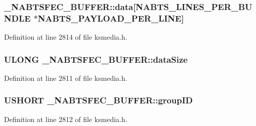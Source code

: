 \subsubsection[{\texorpdfstring{data}{data}}]{ \+\_\+\+N\+A\+B\+T\+S\+F\+E\+C\+\_\+\+B\+U\+F\+F\+E\+R\+::data\mbox{[}{\bf N\+A\+B\+T\+S\+\_\+\+L\+I\+N\+E\+S\+\_\+\+P\+E\+R\+\_\+\+B\+U\+N\+D\+LE} $\ast${\bf N\+A\+B\+T\+S\+\_\+\+P\+A\+Y\+L\+O\+A\+D\+\_\+\+P\+E\+R\+\_\+\+L\+I\+NE}\mbox{]}}\hypertarget{struct___n_a_b_t_s_f_e_c___b_u_f_f_e_r_ad8376043aa7387d9ab4d7795764afa52}{}\label{struct___n_a_b_t_s_f_e_c___b_u_f_f_e_r_ad8376043aa7387d9ab4d7795764afa52}


Definition at line 2814 of file ksmedia.\+h.

\subsubsection[{\texorpdfstring{data\+Size}{dataSize}}]{\setlength{\rightskip}{0pt plus 5cm}U\+L\+O\+NG \+\_\+\+N\+A\+B\+T\+S\+F\+E\+C\+\_\+\+B\+U\+F\+F\+E\+R\+::data\+Size}\hypertarget{struct___n_a_b_t_s_f_e_c___b_u_f_f_e_r_ac4851240a3de014fc6d4550d96f9c15c}{}\label{struct___n_a_b_t_s_f_e_c___b_u_f_f_e_r_ac4851240a3de014fc6d4550d96f9c15c}


Definition at line 2811 of file ksmedia.\+h.

\subsubsection[{\texorpdfstring{group\+ID}{groupID}}]{\setlength{\rightskip}{0pt plus 5cm}U\+S\+H\+O\+RT \+\_\+\+N\+A\+B\+T\+S\+F\+E\+C\+\_\+\+B\+U\+F\+F\+E\+R\+::group\+ID}\hypertarget{struct___n_a_b_t_s_f_e_c___b_u_f_f_e_r_ae64a72cf73b24b1139d0c4c8ed830827}{}\label{struct___n_a_b_t_s_f_e_c___b_u_f_f_e_r_ae64a72cf73b24b1139d0c4c8ed830827}


Definition at line 2812 of file ksmedia.\+h.


